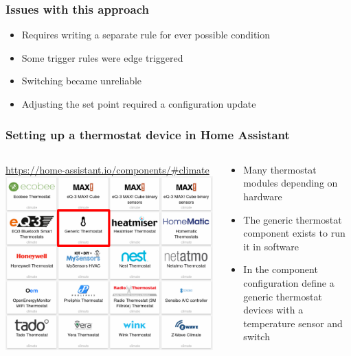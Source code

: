 \documentclass[aspectratio=169,11pt,hyperref={colorlinks=true}]{beamer}
\begin{document}
\begin{frame}
    \frametitle{Issues with this approach}
    \begin{itemize}
        \item Requires writing a separate rule for ever possible condition
        \item Some trigger rules were edge triggered
        \item Switching became unreliable
        \item Adjusting the set point required a configuration update
    \end{itemize}
\end{frame}

\begin{frame}
    \frametitle{Setting up a thermostat device in Home Assistant}
    \begin{columns}[T]
        \begin{column}{.48\textwidth}
            \begin{center}
                \href{https://home-assistant.io/components/\#climate}{https://home-assistant.io/components/\#climate}
                \includegraphics[width=\textwidth]{thermostat_components_2.png}
            \end{center}
        \end{column}
        \begin{column}{.48\textwidth}
            \begin{itemize}
                \item Many thermostat modules depending on hardware
                \item The generic thermostat component exists to run it in
                    software
                \item In the component configuration define a generic thermostat
                    devices with a temperature sensor and switch
            \end{itemize}
        \end{column}
    \end{columns}
\end{frame}
\end{document}
